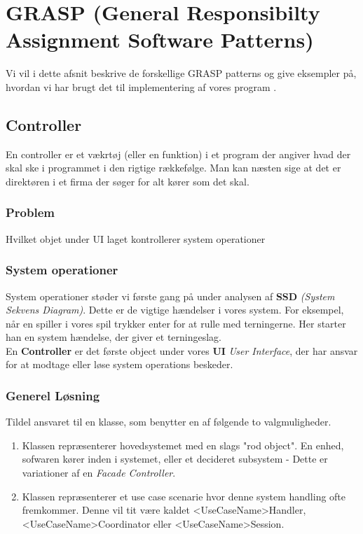 \section{GRASP (General Responsibilty Assignment Software Patterns)}
Vi vil i dette afsnit beskrive de forskellige GRASP patterns og give eksempler på, hvordan vi har brugt det til implementering af vores program \cite{Larman}.
\subsection{Controller}
En controller er et vækrtøj (eller en funktion) i et program der angiver hvad der skal ske i programmet i den rigtige rækkefølge. Man kan næsten sige at det er direktøren i et firma der søger for alt kører som det skal.
\subsubsection*{Problem}
Hvilket objet under UI laget kontrollerer system operationer
\subsubsection*{System operationer}
System operationer støder vi første gang på under analysen af \textbf{SSD} \textit{(System Sekvens Diagram)}. Dette er de vigtige hændelser i vores system.
For eksempel, når en spiller i vores spil trykker enter for at rulle med terningerne. Her starter han en system hændelse, der giver et terningeslag.
\\
En \textbf{Controller} er det første object under vores \textbf{UI} \textit{User Interface}, der har ansvar for at modtage eller løse system operations beskeder.
\subsubsection*{Generel Løsning}
Tildel ansvaret til en klasse, som benytter en af følgende to valgmuligheder.
\begin{enumerate}
\item Klassen repræsenterer hovedsystemet med en slags "rod object". En enhed, sofwaren kører inden i systemet, eller et decideret subsystem - Dette er variationer af en \textit{Facade Controller}.
\item Klassen repræsenterer et use case scenarie hvor denne system handling ofte fremkommer. Denne vil tit være kaldet <UseCaseName>Handler, <UseCaseName>Coordinator eller <UseCaseName>Session.
\end{enumerate}
